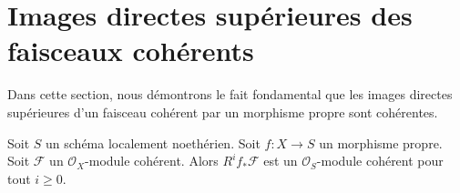 \section{Images directes supérieures des faisceaux cohérents}
\label{section-proper-pushforward}

\noindent
Dans cette section, nous démontrons le fait fondamental que les images
directes supérieures d'un faisceau cohérent par un morphisme propre
sont cohérentes.

\begin{proposition}
\label{proposition-proper-pushforward-coherent}
\begin{reference}
\cite[III Theorem 3.2.1]{EGA}
\end{reference}
Soit $S$ un schéma localement noethérien.
Soit $f : X \to S$ un morphisme propre.
Soit $\mathcal{F}$ un $\mathcal{O}_X$-module cohérent.
Alors $R^if_*\mathcal{F}$ est un $\mathcal{O}_S$-module cohérent
pour tout $i \geq 0$.
\end{proposition}

